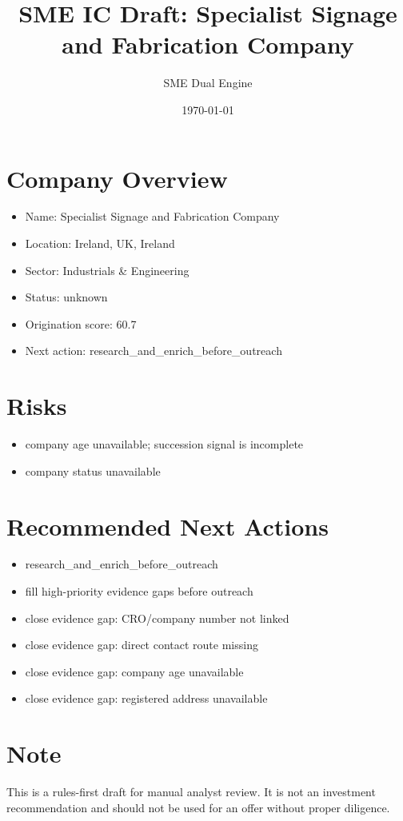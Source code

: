 \documentclass[11pt,a4paper]{article}
\title{SME IC Draft: Specialist Signage and Fabrication Company}
\author{SME Dual Engine}
\date{\today}
\begin{document}
\maketitle
\section*{Company Overview}
\begin{itemize}[leftmargin=1.4em]
\item Name: Specialist Signage and Fabrication Company
\item Location: Ireland, UK, Ireland
\item Sector: Industrials \& Engineering
\item Status: unknown
\item Origination score: 60.7
\item Next action: research\_and\_enrich\_before\_outreach
\end{itemize}
\section*{Risks}
\begin{itemize}[leftmargin=1.4em]
\item company age unavailable; succession signal is incomplete
\item company status unavailable
\end{itemize}
\section*{Recommended Next Actions}
\begin{itemize}[leftmargin=1.4em]
\item research\_and\_enrich\_before\_outreach
\item fill high-priority evidence gaps before outreach
\item close evidence gap: CRO/company number not linked
\item close evidence gap: direct contact route missing
\item close evidence gap: company age unavailable
\item close evidence gap: registered address unavailable
\end{itemize}
\section*{Note}
This is a rules-first draft for manual analyst review. It is not an investment
recommendation and should not be used for an offer without proper diligence.
\end{document}
